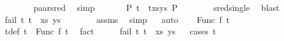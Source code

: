 \begin{isabellebody}
\ \ \ \ \ \ \isamarkupfalse%
\ paar{\isacharunderscore}{\kern0pt}sred\ \isamarkupfalse%
\ simp\isanewline
\ \ \ \ \isamarkupfalse%
\ {\isachardoublequoteopen}{\isasymexists}\ P{}{\isachardot}{\kern0pt}\ {\isacharparenleft}{\kern0pt}{\isacharparenleft}{\kern0pt}t{}\ {\isasymapprox}{\isacharquery}{\kern0pt}\ t{}{\isacharparenright}{\kern0pt}{\isacharhash}{\kern0pt}xs{\isacharcomma}{\kern0pt}ys{\isacharparenright}{\kern0pt}\ {\isasymTurnstile}{\isacharparenleft}{\kern0pt}{\isacharbraceleft}{\kern0pt}{\isacharbraceright}{\kern0pt}{\isacharcomma}{\kern0pt}{\isacharbrackleft}{\kern0pt}{\isacharbrackright}{\kern0pt}{\isacharparenright}{\kern0pt}{\isasymRightarrow}P{}{\isachardoublequoteclose}\isanewline
\ \ \ \ \ \ \isamarkupfalse%
\ sred{\isacharunderscore}{\kern0pt}single\ \isamarkupfalse%
\ blast\isanewline
\ \ \ \ \isamarkupfalse%
\ {\isachardoublequoteopen}fail\ {\isacharparenleft}{\kern0pt}{\isacharparenleft}{\kern0pt}t{}{\isacharcomma}{\kern0pt}\ t{}{\isacharparenright}{\kern0pt}\ {\isacharhash}{\kern0pt}\ xs{\isacharcomma}{\kern0pt}\ ys{\isacharparenright}{\kern0pt}{\isachardoublequoteclose}\isanewline
\ \ \ \ \ \ \isamarkupfalse%
\ assms\ \isamarkupfalse%
\ simp\isanewline
\ \ \isamarkupfalse%
{\isacharparenleft}{\kern0pt}auto{\isacharparenright}{\kern0pt}\isanewline
{}\isamarkupfalse%
\isanewline
\ \ \isamarkupfalse%
\ {\isacharparenleft}{\kern0pt}Func\ f\ t{}{\isacharprime}{\kern0pt}{\isacharparenright}{\kern0pt}\isanewline
\ \ \isamarkupfalse%
\ t{}{\isacharunderscore}{\kern0pt}def{\isacharcolon}{\kern0pt}\ {\isachardoublequoteopen}t{}\ {\isacharequal}{\kern0pt}\ Func\ f\ t{}{\isacharprime}{\kern0pt}{\isachardoublequoteclose}\ \isamarkupfalse%
\ fact\isanewline
\ \ \isamarkupfalse%
\ \isamarkupfalse%
\ {\isachardoublequoteopen}fail\ {\isacharparenleft}{\kern0pt}{\isacharparenleft}{\kern0pt}t{}{\isacharcomma}{\kern0pt}\ t{}{\isacharparenright}{\kern0pt}\ {\isacharhash}{\kern0pt}\ xs{\isacharcomma}{\kern0pt}\ ys{\isacharparenright}{\kern0pt}{\isachardoublequoteclose}\isanewline
\ \ \isamarkupfalse%
{\isacharparenleft}{\kern0pt}cases\ t{}{\isacharparenright}{\kern0pt}\isanewline
\ \ \ \ \isamarkupfalse%

\end{isabellebody}
